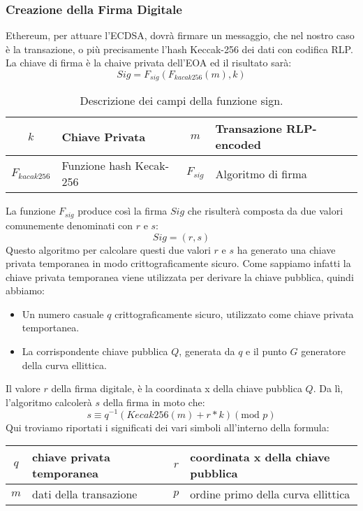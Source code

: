 \subsubsection{Creazione della Firma Digitale}
Ethereum, per attuare l'ECDSA, dovrà firmare un messaggio, che nel nostro caso è la transazione, o più precisamente l'hash Keccak-256 dei dati con codifica RLP. La chiave di firma è la chaive privata dell'EOA ed il risultato sarà:
%
\[ Sig = F_{sig}( F_{kacak256}(m), k )\]
%
\begin{table}[]
	\centering
	\begin{tabular}{|c|l||c|l|}
		\hline
		$k$ & Chiave Privata & $m$ & Transazione RLP-encoded \\ \hline
		$F_{kacak256}$ & Funzione hash Kecak-256 & $F_{sig}$ & Algoritmo di firma \\ \hline
	\end{tabular}
\caption{Descrizione dei campi della funzione sign.}
\label{tab:descr_fun_sign}
\end{table}
%
La funzione $F_{sig}$ produce così la firma $Sig$ che risulterà composta da due valori comunemente denominati con $r$ e $s$:
%
\[Sig = (r, s)\]
%
Questo algoritmo per calcolare questi due valori $r$ e $s$ ha generato una chiave privata temporanea in modo crittograficamente sicuro. Come sappiamo infatti la chiave privata temporanea viene utilizzata per derivare la chiave pubblica, quindi abbiamo:
\begin{itemize}
	\item Un numero casuale $q$ crittograficamente sicuro, utilizzato come chiave privata temportanea.
	\item La corrispondente chiave pubblica $Q$, generata da $q$ e il punto $G$ generatore della curva ellittica.
\end{itemize}
Il valore $r$ della firma digitale, è la coordinata x della chiave pubblica $Q$. Da lì, l'algoritmo calcolerà $s$ della firma in moto che:
%
\[ s \equiv q^{-1} ( Kecak256( m ) + r * k )( \text{mod } p ) \]
%
Qui troviamo riportati i significati dei vari simboli all'interno della formula:
\begin{table}[h]
	\centering
	\begin{tabular}{|c|l||c|l|}
		\hline
		$q$ & chiave privata temporanea & $r$ & coordinata x della chiave pubblica\\ \hline
		$m$ & dati della transazione & $p$ & ordine primo della curva ellittica\\ \hline
	\end{tabular}
\end{table}
